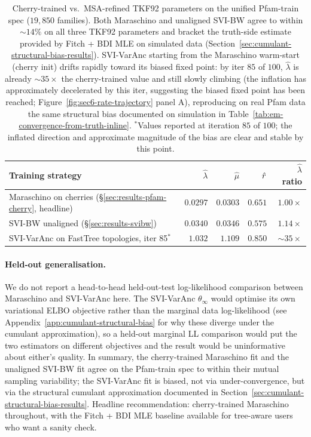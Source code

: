 \begin{table}[ht]
\centering\small
\begin{tabular}{lrrrr}
\toprule
Training strategy & $\hat\lambda$ & $\hat\mu$ & $\hat{r}$ & $\hat\lambda$ ratio \\
\midrule
Maraschino on cherries (\S\ref{sec:results-pfam-cherry}, headline)
                                       & $0.0297$ & $0.0303$ & $0.651$ & $1.00\times$ \\
SVI-BW unaligned (\S\ref{sec:results-svibw})
                                       & $0.0340$ & $0.0346$ & $0.575$ & $1.14\times$ \\
SVI-VarAnc on FastTree topologies, iter 85$^{*}$
                                       & $1.032$  & $1.109$  & $0.850$ & $\sim 35\times$ \\
\bottomrule
\end{tabular}
\caption{Cherry-trained vs.\ MSA-refined TKF92 parameters on
the unified Pfam-train spec ($19{,}850$ families).  Both
Maraschino and unaligned SVI-BW agree to within $\sim 14\%$ on
all three TKF92 parameters and bracket the truth-side estimate
provided by Fitch + BDI MLE on simulated data
(Section~\ref{sec:cumulant-structural-bias-results}).
SVI-VarAnc starting from the Maraschino warm-start (cherry
init) drifts rapidly toward its biased fixed point: by
iter $85$ of $100$, $\hat\lambda$ is already
$\sim 35\times$ the cherry-trained value and still slowly
climbing (the inflation has approximately decelerated by this
iter, suggesting the biased fixed point has been reached;
Figure~\ref{fig:sec6-rate-trajectory} panel A), reproducing on
real Pfam data the same structural bias documented on simulation
in Table~\ref{tab:em-convergence-from-truth-inline}.  $^{*}$Values
reported at iteration $85$ of $100$; the inflated direction and
approximate magnitude of the bias are clear and stable by this
point.}
\label{tab:cherry-vs-msa-pfam-train}
\end{table}

\paragraph{Held-out generalisation.}
We do not report a head-to-head held-out-test log-likelihood
comparison between Maraschino and SVI-VarAnc here.  The
SVI-VarAnc $\theta_\infty$ would optimise its own variational
ELBO objective rather than the marginal data log-likelihood
(see Appendix~\ref{app:cumulant-structural-bias} for why these
diverge under the cumulant approximation), so a held-out marginal
LL comparison would put the two estimators on different objectives
and the result would be uninformative about either's quality.
In summary, the cherry-trained Maraschino fit and
the unaligned SVI-BW fit agree on the Pfam-train spec to within
their mutual sampling variability; the SVI-VarAnc fit is biased,
not via under-convergence, but via the structural cumulant
approximation documented in
Section~\ref{sec:cumulant-structural-bias-results}.  Headline
recommendation: cherry-trained Maraschino throughout, with the
Fitch + BDI MLE baseline available for tree-aware users who want
a sanity check.

